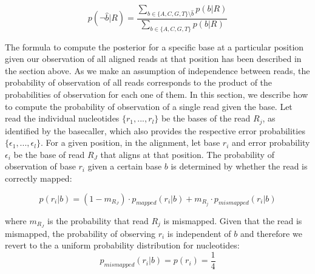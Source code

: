 \documentclass[a4paper,12pt]{article}
\begin{document}
\begin{equation}
p(\neg \hat{b}|R) = \frac { \sum\limits_{ b \in \{A,C,G,T\}  \setminus \hat{b} } p(b|R) } { \sum\limits_{ b \in \{A,C,G,T\}  } p(b|R) }
\label{eqn:errormt}
\end{equation}














 
\label{sec:forgivenread}

\noindent The formula to compute the posterior for a specific base at a particular position given our observation of all aligned reads at that position has been described in the section above. As we make an assumption of independence between reads, the probability of observation of all reads corresponds to the product of the probabilities of observation for each one of them. In this section, we describe how to compute the probability of observation of a single read given the base. Let read the individual nucleotides $\{ r_1, ..., r_l \}$ be the bases of the read $R_j$, as identified by the basecaller, which also provides the respective error probabilities $\{ \epsilon_1, ..., \epsilon_l \}$. For a given position, in the alignment, let base $r_i$ and error probability $\epsilon_i$ be the base of read $R_J$ that aligns at that position. The probability of observation of base $r_i$ given a certain base $b$ is determined by whether the read is correctly mapped:

\begin{equation}
  p(r_i|b)   =  (1-m_{R_J}) \cdot p_{mapped}(r_i|b) + m_{R_j} \cdot p_{mismapped}(r_i|b) 
\end{equation} 

\noindent where $m_{R_J}$ is the probability that read $R_j$ is mismapped. Given that the read is mismapped, the probability of observing $r_i$ is independent of $b$ and therefore we revert to the a uniform probability distribution for nucleotides:
\begin{equation}
  p_{mismapped}(r_i|b)   =  p(r_i) =     \frac{ 1} {4} 
\label{eqn:mismapped}
\end{equation} 
\end{document}
